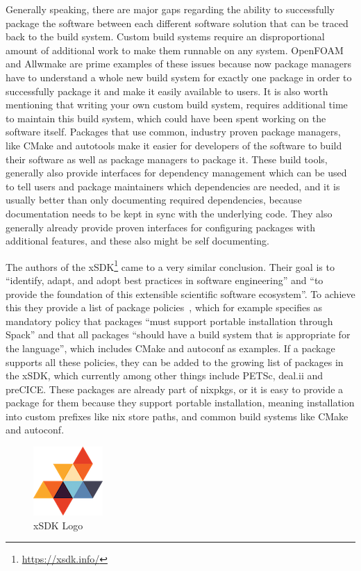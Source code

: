 \documentclass[conference,final,a4paper]{IEEEtran}
\begin{document}
Generally speaking, there are major gaps regarding the ability to successfully package the software between each different software solution that can be traced back to the build system.
Custom build systems require an disproportional amount of additional work to make them runnable on any system.
OpenFOAM and Allwmake are prime examples of these issues because now package managers have to understand a whole new build system for exactly one package in order to successfully package it and make it easily available to users.
It is also worth mentioning that writing your own custom build system, requires additional time to maintain this build system, which could have been spent working on the software itself.
Packages that use common, industry proven package managers, like CMake and autotools make it easier for developers of the software to build their software as well as package managers to package it.
These build tools, generally also provide interfaces for dependency management which can be used to tell users and package maintainers which dependencies are needed, and it is usually better than only documenting required dependencies, because documentation needs to be kept in sync with the underlying code.
They also generally already provide proven interfaces for configuring packages with additional features, and these also might be self documenting.

The authors of the xSDK\footnote{\url{https://xsdk.info/}} came to a very similar conclusion.
Their goal is to ``identify, adapt, and adopt best practices in software engineering''\cite{xsdk-website} and ``to provide the foundation of this extensible scientific software ecosystem''\cite{xsdk-website}.
To achieve this they provide a list of package policies~\cite{xSDK2023}, which for example specifies as mandatory policy that packages ``must support portable installation through Spack''\cite{xSDK2023} and that all packages ``should have a build system that is appropriate for the language''\cite{xSDK2023}, which includes CMake and autoconf as examples.
If a package supports all these policies, they can be added to the growing list of packages in the xSDK, which currently among other things include PETSc, deal.ii and preCICE.
These packages are already part of nixpkgs, or it is easy to provide a package for them because they support portable installation, meaning installation into custom prefixes like nix store paths, and common build systems like CMake and autoconf.
\begin{figure}[htbp]
  \centerline{\includegraphics{figures/xsdk.png}}
  \caption{xSDK Logo}
  \label{fig}
\end{figure}
\end{document}
